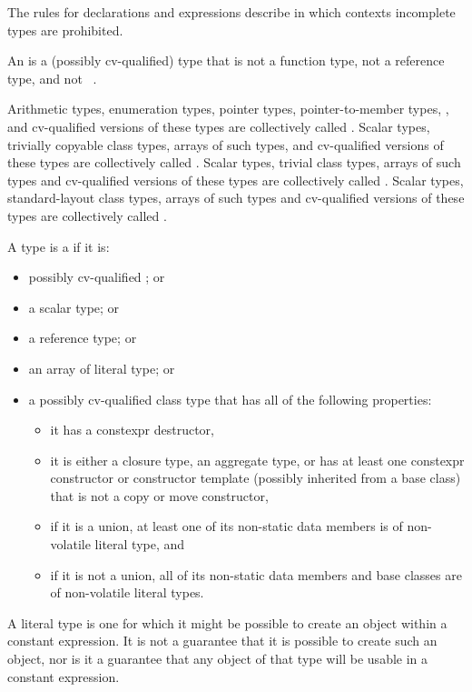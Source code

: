 \pnum
\begin{note} The rules for declarations and expressions describe in which
contexts incomplete types are prohibited. \end{note}

\pnum
An  is a (possibly cv-qualified) type that is not
a function type, not a reference type, and not \cv{}~.

\pnum
{}%
%
%
Arithmetic types, enumeration types,
pointer types, pointer-to-member types,
,
and
cv-qualified versions of these
types are collectively called
.
Scalar types, trivially copyable class types,
arrays of such types, and cv-qualified versions of these
types are collectively called .
Scalar types, trivial class types,
arrays of such types and cv-qualified versions of these
types are collectively called
. Scalar types, standard-layout class
types, arrays of such types and
cv-qualified versions of these types
are collectively called .

\pnum
A type is a  if it is:
\begin{itemize}
\item possibly cv-qualified ; or
\item a scalar type; or
\item a reference type; or
\item an array of literal type; or
\item a possibly cv-qualified class type that
has all of the following properties:
\begin{itemize}
\item it has a constexpr destructor,
\item it is either a closure type,
an aggregate type, or
has at least one constexpr constructor or constructor template
(possibly inherited from a base class)
that is not a copy or move constructor,
\item if it is a union, at least one of its non-static data members is
of non-volatile literal type, and
\item if it is not a union, all of its non-static data members and base classes are
of non-volatile literal types.
\end{itemize}
\end{itemize}
\begin{note}
A literal type is one for which
it might be possible to create an object
within a constant expression.
It is not a guarantee that it is possible to create such an object,
nor is it a guarantee that any object of that type
will be usable in a constant expression.
\end{note}

